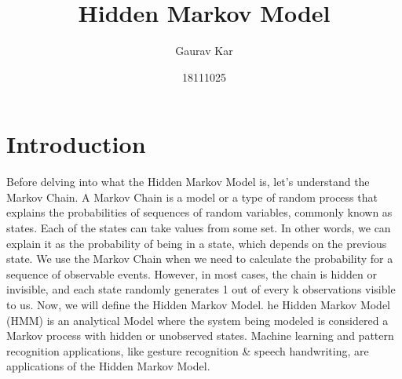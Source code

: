 \documentclass{article}
\title{Hidden Markov Model}
\author{Gaurav Kar}
\date{18111025}
\begin{document}
\maketitle

\section{Introduction}
Before delving into what the Hidden Markov Model is, let’s understand the Markov Chain. A Markov Chain is a model or a type of random process that explains the probabilities of sequences of random variables, commonly known as states. Each of the states can take values from some set. In other words, we can explain it as the probability of being in a state, which depends on the previous state. We use the Markov Chain when we need to calculate the probability for a sequence of observable events. However, in most cases, the chain is hidden or invisible, and each state randomly generates 1 out of every k observations visible to us. Now, we will define the Hidden Markov Model. he Hidden Markov Model (HMM) is an analytical Model where the system being modeled is considered a Markov process with hidden or unobserved states. Machine learning and pattern recognition applications, like gesture recognition & speech handwriting, are applications of the Hidden Markov Model.
\end{document}
